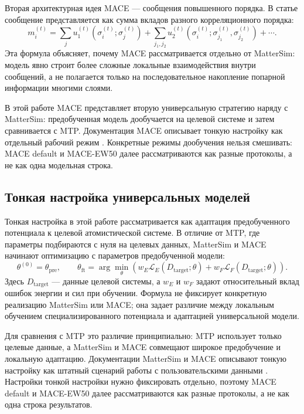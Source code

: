 Вторая архитектурная идея MACE — сообщения повышенного порядка. В статье сообщение представляется как сумма вкладов разного корреляционного порядка:
\[
    m_i^{(t)}
    =
    \sum_j u_1^{(t)}(\sigma_i^{(t)};\sigma_j^{(t)})
    +
    \sum_{j_1,j_2}
    u_2^{(t)}(\sigma_i^{(t)};\sigma_{j_1}^{(t)},\sigma_{j_2}^{(t)})
    + \cdots .
    \label{eq:mace_body_order_expansion}
\]
Эта формула объясняет, почему MACE рассматривается отдельно от MatterSim: модель явно строит более сложные локальные взаимодействия внутри сообщений, а не полагается только на последовательное накопление попарной информации многими слоями.

В этой работе MACE представляет вторую универсальную стратегию наряду с MatterSim: предобученная модель дообучается на целевой системе и затем сравнивается с MTP. Документация MACE описывает тонкую настройку как отдельный рабочий режим \cite{macefinetuningdocs}. Конкретные режимы дообучения нельзя смешивать: MACE default и MACE-EW50 далее рассматриваются как разные протоколы, а не как одна модельная строка.

\subsection{Тонкая настройка универсальных моделей}

Тонкая настройка в этой работе рассматривается как адаптация предобученного потенциала к целевой атомистической системе. В отличие от MTP, где параметры подбираются с нуля на целевых данных, MatterSim и MACE начинают оптимизацию с параметров предобученной модели:
\[
    \theta^{(0)}=\theta_{\mathrm{pre}},
    \qquad
    \theta_{\mathrm{ft}}
    =
    \arg\min_{\theta}
    \left(
        w_E\mathcal{L}_E(D_{\mathrm{target}};\theta)
        +
        w_F\mathcal{L}_F(D_{\mathrm{target}};\theta)
    \right).
    \label{eq:finetuning_objective}
\]
Здесь \(D_{\mathrm{target}}\) — данные целевой системы, а \(w_E\) и \(w_F\) задают относительный вклад ошибок энергии и сил при обучении. Формула не фиксирует конкретную реализацию MatterSim или MACE; она задает различие между локальным обучением специализированного потенциала и адаптацией универсальной модели.

Для сравнения с MTP это различие принципиально: MTP использует только целевые данные, а MatterSim и MACE совмещают широкое предобучение и локальную адаптацию. Документации MatterSim и MACE описывают тонкую настройку как штатный сценарий работы с пользовательскими данными \cite{mattersimfinetuningdocs,macefinetuningdocs}. Настройки тонкой настройки нужно фиксировать отдельно, поэтому MACE default и MACE-EW50 далее рассматриваются как разные протоколы, а не как одна строка результатов.

